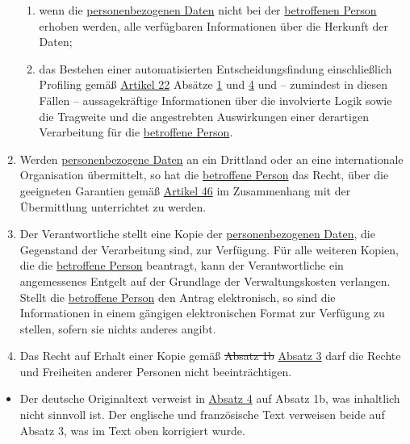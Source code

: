 \begin{enumerate}
\begin{enumerate}
    \item wenn die \hyperref[itm:04-1]{personenbezogenen Daten} nicht bei der \hyperref[itm:04-1]{betroffenen Person} erhoben werden, alle verfügbaren
     Informationen über die Herkunft der Daten;
    \label{itm:15-1g}

    \item das Bestehen einer automatisierten Entscheidungsfindung einschließlich Profiling gemäß \hyperref[ch:22]
     {Artikel 22} Absätze \hyperref[itm:22-1]{1} und \hyperref[itm:22-4]{4} und -- zumindest in diesen Fällen --
     aussagekräftige Informationen über die involvierte Logik sowie die Tragweite und die angestrebten Auswirkungen
     einer derartigen Verarbeitung für die \hyperref[itm:04-1]{betroffene Person}.
    \label{itm:15-1h}

  \end{enumerate}

  \item Werden \hyperref[itm:04-1]{personenbezogene Daten} an ein Drittland oder an eine internationale Organisation übermittelt, so hat die
   \hyperref[itm:04-1]{betroffene Person} das Recht, über die geeigneten Garantien gemäß \hyperref[ch:46]{Artikel 46} im Zusammenhang mit der
   Übermittlung unterrichtet zu werden.
  \label{itm:15-2}

  \item Der Verantwortliche stellt eine Kopie der \hyperref[itm:04-1]{personenbezogenen Daten}, die Gegenstand der Verarbeitung sind, zur
   Verfügung. Für alle weiteren Kopien, die die \hyperref[itm:04-1]{betroffene Person} beantragt, kann der Verantwortliche ein angemessenes
   Entgelt auf der Grundlage der Verwaltungskosten verlangen. Stellt die \hyperref[itm:04-1]{betroffene Person} den Antrag elektronisch, so
   sind die Informationen in einem gängigen elektronischen Format zur Verfügung zu stellen, sofern sie nichts anderes
   angibt.
  \label{itm:15-3}

  \item Das Recht auf Erhalt einer Kopie gemäß \sout{Absatz 1b} \hyperref[itm:15-3]{Absatz 3} darf die Rechte und
   Freiheiten anderer Personen nicht beeinträchtigen.
  \label{itm:15-4}

\end{enumerate}


\begin{itemize}

  \item Der deutsche Originaltext verweist in \hyperref[itm:15-4]{Absatz 4} auf Absatz 1b, was inhaltlich nicht sinnvoll
   ist. Der englische und französische Text verweisen beide auf Absatz 3, was im Text oben korrigiert wurde.

\end{itemize}


